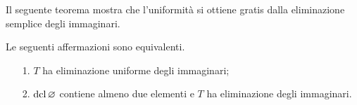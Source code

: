 Il seguente teorema mostra che l'uniformit\`a si ottiene gratis dalla eliminazione semplice degli immaginari.

\begin{theorem}\label{thm_ei_unif} Le seguenti affermazioni sono equivalenti.
\begin{itemize}
\item[1.] $T$ ha eliminazione uniforme degli immaginari;
\item[2.] $\mathop{\rm dcl}\varnothing$ contiene almeno due elementi e $T$ ha eliminazione degli immaginari.
\end{itemize}
\end{theorem}

\def\ceq#1#2#3{\parbox[t]{35ex}{$\displaystyle #1$}\parbox[t]{5ex}{$\displaystyle\hfil #2$}{$\displaystyle #3$}}


